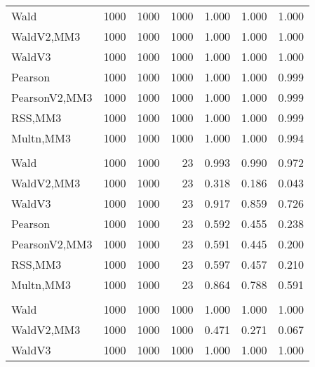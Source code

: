 \documentclass[
]{article}
\begin{document}
\begin{table}[H]
{\begin{tabular}[t]{lrrrrrr}
\hspace{1em}Wald & 1000 & 1000 & 1000 & 1.000 & 1.000 & \vphantom{1} 1.000\\
\hspace{1em}WaldV2,MM3 & 1000 & 1000 & 1000 & 1.000 & 1.000 & 1.000\\
\hspace{1em}WaldV3 & 1000 & 1000 & 1000 & 1.000 & 1.000 & \vphantom{1} 1.000\\
\hspace{1em}Pearson & 1000 & 1000 & 1000 & 1.000 & 1.000 & 0.999\\
\hspace{1em}PearsonV2,MM3 & 1000 & 1000 & 1000 & 1.000 & 1.000 & 0.999\\
\hspace{1em}RSS,MM3 & 1000 & 1000 & 1000 & 1.000 & 1.000 & 0.999\\
\hspace{1em}Multn,MM3 & 1000 & 1000 & 1000 & 1.000 & 1.000 & 0.994\\
\addlinespace[0.3em]
\multicolumn{7}{l}{\textbf{2F 10V}}\\
\hspace{1em}Wald & 1000 & 1000 & 23 & 0.993 & 0.990 & 0.972\\
\hspace{1em}WaldV2,MM3 & 1000 & 1000 & 23 & 0.318 & 0.186 & 0.043\\
\hspace{1em}WaldV3 & 1000 & 1000 & 23 & 0.917 & 0.859 & 0.726\\
\hspace{1em}Pearson & 1000 & 1000 & 23 & 0.592 & 0.455 & 0.238\\
\hspace{1em}PearsonV2,MM3 & 1000 & 1000 & 23 & 0.591 & 0.445 & 0.200\\
\hspace{1em}RSS,MM3 & 1000 & 1000 & 23 & 0.597 & 0.457 & 0.210\\
\hspace{1em}Multn,MM3 & 1000 & 1000 & 23 & 0.864 & 0.788 & 0.591\\
\addlinespace[0.3em]
\multicolumn{7}{l}{\textbf{3F 15V}}\\
\hspace{1em}Wald & 1000 & 1000 & 1000 & 1.000 & 1.000 & 1.000\\
\hspace{1em}WaldV2,MM3 & 1000 & 1000 & 1000 & 0.471 & 0.271 & 0.067\\
\hspace{1em}WaldV3 & 1000 & 1000 & 1000 & 1.000 & 1.000 & 1.000\\

\end{tabular}}
\end{table}
\end{document}
